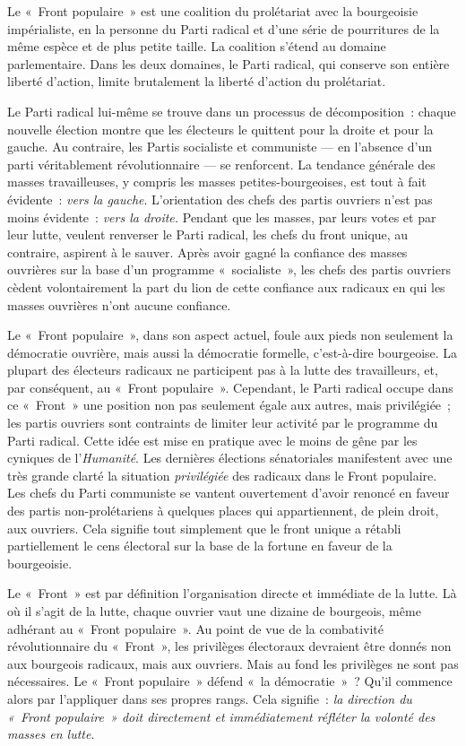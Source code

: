 \documentclass[french,twoside]{book} %
\newcommand\chaptercont{} %
\begin{document}
\chaptercont
\noindent Le « Front populaire » est une coalition du prolétariat avec la bourgeoisie impérialiste, en la personne du Parti radical et d’une série de pourritures de la même espèce et de plus petite taille. La coalition s’étend au domaine parlementaire. Dans les deux domaines, le Parti radical, qui conserve son entière liberté d’action, limite brutalement la liberté d’action du prolétariat.\par
Le Parti radical lui-même se trouve dans un processus de décomposition : chaque nouvelle élection montre que les électeurs le quittent pour la droite et pour la gauche. Au contraire, les Partis socialiste et communiste — en l’absence d’un parti véritablement révolutionnaire — se renforcent. La tendance générale des masses travailleuses, y compris les masses petites-bourgeoises, est tout à fait évidente : \emph{vers la gauche}. L’orientation des chefs des partis ouvriers n’est pas moins évidente : \emph{vers la droite. }Pendant que les masses, par leurs votes et par leur lutte, veulent renverser le Parti radical, les chefs du front unique, au contraire, aspirent à le sauver. Après avoir gagné la confiance des masses ouvrières sur la base d’un programme « socialiste », les chefs des partis ouvriers cèdent volontairement la part du lion de cette confiance aux radicaux en qui les masses ouvrières n’ont aucune confiance.\par
Le « Front populaire », dans son aspect actuel, foule  aux pieds non seulement la démocratie ouvrière, mais aussi la démocratie formelle, c’est-à-dire bourgeoise. La plupart des électeurs radicaux ne participent pas à la lutte des travailleurs, et, par conséquent, au « Front populaire ». Cependant, le Parti radical occupe dans ce « Front » une position non pas seulement égale aux autres, mais privilégiée ; les partis ouvriers sont contraints de limiter leur activité par le programme du Parti radical. Cette idée est mise en pratique avec le moins de gêne par les cyniques de l’\emph{Humanité}. Les dernières élections sénatoriales manifestent avec une très grande clarté la situation \emph{privilégiée} des radicaux dans le Front populaire. Les chefs du Parti communiste se vantent ouvertement d’avoir renoncé en faveur des partis non-prolétariens à quelques places qui appartiennent, de plein droit, aux ouvriers. Cela signifie tout simplement que le front unique a rétabli partiellement le cens électoral sur la base de la fortune en faveur de la bourgeoisie.\par
Le « Front » est par définition l’organisation directe et immédiate de la lutte. Là où il s’agit de la lutte, chaque ouvrier vaut une dizaine de bourgeois, même adhérant au « Front populaire ». Au point de vue de la combativité révolutionnaire du « Front », les privilèges électoraux devraient être donnés non aux bourgeois radicaux, mais aux ouvriers. Mais au fond les privilèges ne sont pas nécessaires. Le « Front populaire » défend « la démocratie » ? Qu’il commence alors par l’appliquer dans ses propres rangs. Cela signifie : \emph{la direction du « Front populaire » doit directement et immédiatement réfléter la volonté des masses en lutte}.\par
\end{document}

